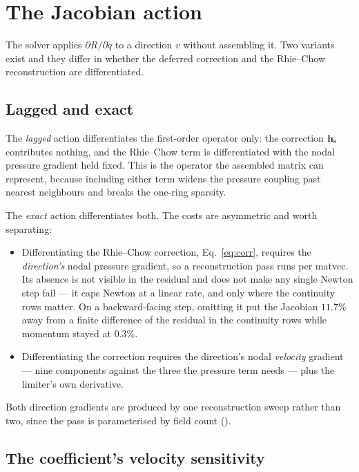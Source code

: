 \section{The Jacobian action}
\label{sec:jac}

The solver applies $\partial R/\partial q$ to a direction $v$ without assembling it. Two variants
exist and they differ in whether the deferred correction and the Rhie--Chow reconstruction are
differentiated.

\subsection{Lagged and exact}

The \emph{lagged} action differentiates the first-order operator only: the correction
$\mathbf{h}_{\mathrm{s}}$ contributes nothing, and the Rhie--Chow term is differentiated with the nodal
pressure gradient held fixed. This is the operator the assembled matrix can represent, because
including either term widens the pressure coupling past nearest neighbours and breaks the
one-ring sparsity.

The \emph{exact} action differentiates both. The costs are asymmetric and worth separating:

\begin{itemize}
\item Differentiating the Rhie--Chow correction, Eq.~\eqref{eq:corr}, requires the
      \emph{direction's} nodal pressure gradient, so a reconstruction pass runs per matvec. Its
      absence is not visible in the residual and does not make any single Newton step fail --- it
      caps Newton at a linear rate, and only where the continuity rows matter. On a
      backward-facing step, omitting it put the Jacobian $11.7\%$ away from a finite difference of
      the residual in the continuity rows while momentum stayed at $0.3\%$.
\item Differentiating the correction requires the direction's nodal \emph{velocity} gradient ---
      nine components against the three the pressure term needs --- plus the limiter's own
      derivative.
\end{itemize}

Both direction gradients are produced by one reconstruction sweep rather than two, since the pass
is parameterised by field count ().

\subsection{The coefficient's velocity sensitivity}

